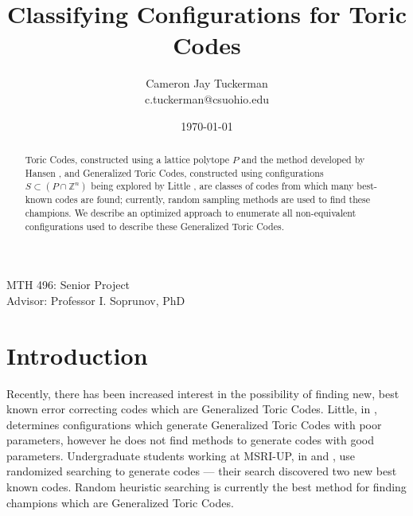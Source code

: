 \documentclass[12pt]{amsart}
\theoremstyle{plain}
\begin{document}


\begin{titlepage}
\begin{center}
\title{Classifying Configurations for Toric Codes}
\author{Cameron Jay Tuckerman\\
\tiny{c.tuckerman@csuohio.edu}}
\date{\today}
\maketitle
\small{MTH 496: Senior Project}\\
\small{Advisor: Professor I. Soprunov, PhD}
\end{center}
\end{titlepage}
\newpage
\begin{abstract}
Toric Codes, constructed using a lattice polytope $P$ and the method developed by Hansen \cite{hansen}, and  Generalized Toric Codes, constructed using configurations $S \subset (P \cap \mathbb{Z}^n)$ being explored by Little \cite{little}, are classes of codes from which many best-known codes are found; currently, random sampling methods are used to find these champions. We describe an optimized approach to enumerate all non-equivalent configurations used to describe these Generalized Toric Codes.
\end{abstract}
\newpage
\tableofcontents
\newpage

%
%
%
%
%
%

\section{Introduction}
Recently, there has been increased interest in the possibility of finding new, best known error correcting codes which are Generalized Toric Codes. Little, in \cite{little}, determines configurations which generate Generalized Toric Codes with poor parameters, however he does not find methods to generate codes with good parameters. Undergraduate students working at MSRI-UP, in \cite{census1} and \cite{census2}, use randomized searching to generate codes --- their search discovered two new best known codes. Random heuristic searching is currently the best method for finding champions which are Generalized Toric Codes.
\end{document}
